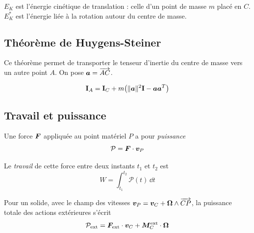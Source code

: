 \begin{note}
    $E_K$ est l'énergie cinétique de translation : celle d'un point
    de masse $m$ placé en $C$. $E_K^*$ est l'énergie liée à la
    rotation autour du centre de masse.
\end{note}

\newpage
\subsection{Théorème de Huygens-Steiner}

Ce théorème permet de transporter le tenseur d'inertie du centre de
masse vers un autre point $A$. On pose $\bm{a} = \overrightarrow{AC}$.

\begin{theoreme}
    \[
        \mathbf{I}_A = \mathbf{I}_C
        + m\bigl(\|\bm{a}\|^2\mathbf{I} - \bm{a}\bm{a}^T\bigr)
    \]
\end{theoreme}

\subsection{Travail et puissance}

\begin{definition}[Puissance]
    Une force $\bm{F}$ appliquée au point matériel $P$ a pour
    \emph{puissance}
    \[
        \mathcal{P} = \bm{F}\cdot\bm{v}_P
    \]
\end{definition}

\begin{definition}[Travail]
    Le \emph{travail} de cette force entre deux instants $t_1$ et $t_2$
    est
    \[
        W = \int_{t_1}^{t_2}\mathcal{P}(t)\,\dd t
    \]
\end{definition}

Pour un solide, avec le champ des vitesses
$\bm{v}_P = \bm{v}_C + \bm{\Omega}\wedge\overrightarrow{CP}$, la
puissance totale des actions extérieures s'écrit
\[
    \mathcal{P}_{\mathrm{ext}}
    = \bm{F}_{\mathrm{ext}}\cdot\bm{v}_C
    + \bm{M}_C^{\mathrm{ext}}\cdot\bm{\Omega}
\]
\newpage
